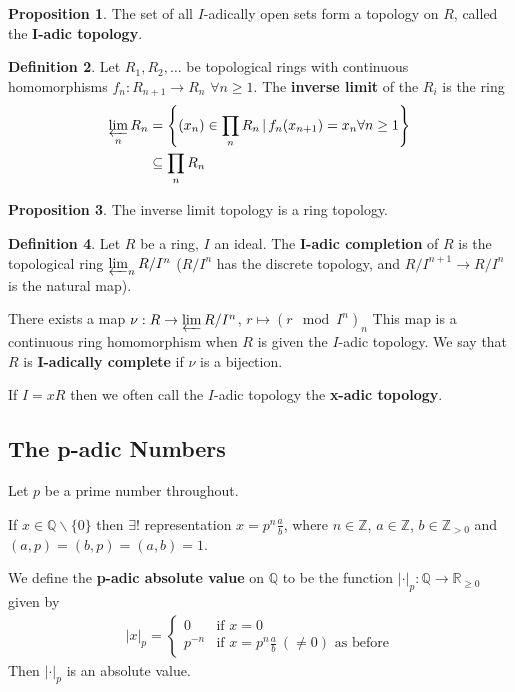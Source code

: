 \documentclass[a4paper]{article}
\theoremstyle{definition}
\newtheorem{definition}{Definition}
\theoremstyle{default}
\newtheorem{prop}[definition]{Proposition}
\theoremstyle{remark}
\newcommand*\abs[1]{\left|#1\right|}
\begin{document}
\begin{prop}
	The set of all $I$-adically open sets form a topology on $R$, called the \textbf{I-adic topology}.
\end{prop}

\begin{definition}
	Let $R_1, R_2, \dots$ be topological rings with continuous homomorphisms $f_n:R_{n+1}\to R_n$ $\forall n \geq 1$. The \textbf{inverse limit} of the $R_i$ is the ring
	\begin{align*}
		\varprojlim_n R_n &= \left\{(x_n) \in \prod_n R_n \,|\, f_n(x_{n+1})=x_n \forall n \geq 1  \right\}\\
		&\subseteq \prod_n R_n
	\end{align*}
\end{definition}

\begin{prop}
	The inverse limit topology is a ring topology.
\end{prop}

\begin{definition}
	Let $R$ be a ring, $I$ an ideal. The \textbf{I-adic completion} of $R$ is the topological ring $\varprojlim_n R/I^n$ ($R/I^n$ has the discrete topology, and $R/I^{n+1} \to R/I^{n}$ is the natural map).
	
	There exists a map $\nu: R \to \varprojlim R/I^n$, $r \mapsto (r \mod I^n)_n$ This map is a continuous ring homomorphism when $R$ is given the $I$-adic topology. We say that $R$ is \textbf{I-adically complete} if $\nu$ is a bijection.
	
	If $I=xR$ then we often call the $I$-adic topology the \textbf{x-adic topology}.
\end{definition}

\subsection{The p-adic Numbers}
Let $p$ be a prime number throughout.

If $x \in \mathbb{Q} \backslash \{0\}$ then $\exists!$ representation $x=p^n \frac{a}{b}$,
where $n \in \mathbb{Z}$, $a \in \mathbb{Z}$,
$b \in \mathbb{Z}_{>0}$ and $(a,p)=(b,p)=(a,b)=1$.

We define the \textbf{p-adic absolute value} on $\mathbb{Q}$ to be the function $\abs{\cdot}_p: \mathbb{Q} \to \mathbb{R}_{\geq 0}$ given by
\begin{align*}
	\abs{x}_p =
	\begin{cases}
	0 &\text{if } x=0\\
	p^{-n}  &\text{if } x=p^n \frac{a}{b}\ (\neq 0) \text{ as before}
	\end{cases}
\end{align*}
Then $\abs{\cdot}_p$ is an absolute value.
\end{document}
